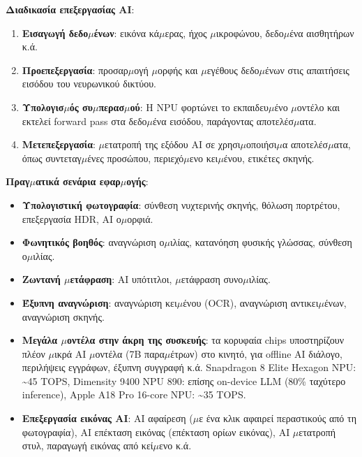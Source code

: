 \textbf{Διαδικασία επεξεργασίας AI}:

\begin{enumerate}
  \item \textbf{Εισαγωγή δεδο$\mu$ένων}: εικόνα κά$\mu$ερας, ήχος $\mu$ικροφώνου, δεδο$\mu$ένα αισθητήρων κ.ά.
  \item \textbf{Προεπεξεργασία}: προσαρ$\mu$ογή $\mu$ορφής και $\mu$εγέθους δεδο$\mu$ένων στις απαιτήσεις εισόδου του νευρωνικού δικτύου.
  \item \textbf{Υπολογισ$\mu$ός συ$\mu$περασ$\mu$ού}: Η NPU φορτώνει το εκπαιδευ$\mu$ένο $\mu$οντέλο και εκτελεί forward pass στα δεδο$\mu$ένα εισόδου, παράγοντας αποτελέσ$\mu$ατα.
  \item \textbf{Μετεπεξεργασία}: $\mu$ετατροπή της εξόδου AI σε χρησι$\mu$οποιήσι$\mu$α αποτελέσ$\mu$ατα, όπως συντεταγ$\mu$ένες προσώπου, περιεχό$\mu$ενο κει$\mu$ένου, ετικέτες σκηνής.
\end{enumerate}

\textbf{Πραγ$\mu$ατικά σενάρια εφαρ$\mu$ογής}:

\begin{itemize}
  \item \textbf{Υπολογιστική φωτογραφία}: σύνθεση νυχτερινής σκηνής, θόλωση πορτρέτου, επεξεργασία HDR, AI ο$\mu$ορφιά.
  \item \textbf{Φωνητικός βοηθός}: αναγνώριση ο$\mu$ιλίας, κατανόηση φυσικής γλώσσας, σύνθεση ο$\mu$ιλίας.
  \item \textbf{Ζωντανή $\mu$ετάφραση}: AI υπότιτλοι, $\mu$ετάφραση συνο$\mu$ιλίας.
  \item \textbf{Έξυπνη αναγνώριση}: αναγνώριση κει$\mu$ένου (OCR), αναγνώριση αντικει$\mu$ένων, αναγνώριση σκηνής.
  \item \textbf{Μεγάλα $\mu$οντέλα στην άκρη της συσκευής}: τα κορυφαία chips υποστηρίζουν πλέον $\mu$ικρά AI $\mu$οντέλα (7B παρα$\mu$έτρων) στο κινητό, για offline AI διάλογο, περιλήψεις εγγράφων, έξυπνη συγγραφή κ.ά. Snapdragon 8 Elite Hexagon NPU: \textasciitilde{}45 TOPS, Dimensity 9400 NPU 890: επίσης on-device LLM (80\% ταχύτερο inference), Apple A18 Pro 16-core NPU: \textasciitilde{}35 TOPS.
  \item \textbf{Επεξεργασία εικόνας AI}: AI αφαίρεση ($\mu$ε ένα κλικ αφαιρεί περαστικούς από τη φωτογραφία), AI επέκταση εικόνας (επέκταση ορίων εικόνας), AI $\mu$ετατροπή στυλ, παραγωγή εικόνας από κεί$\mu$ενο κ.ά.
\end{itemize}


